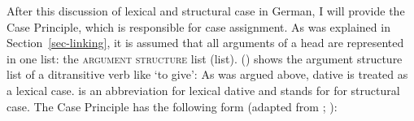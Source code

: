 








After this discussion of lexical and structural case in German, I will provide the Case Principle,
which is responsible for case assignment. As was explained in Section~\ref{sec-linking}, it is assumed that all arguments of a
head are represented in one list: the \textsc{argument structure} list (\argst list). 
() shows the argument structure list of a ditransitive verb like  `to give':
\ea
{}
\z
As was argued above, dative is treated as a lexical case.  is an abbreviation for lexical
dative and  stands for for structural case. The Case
Principle has the following form (adapted from \citealp{Prze99}; \citealp{Meurers99b}):

